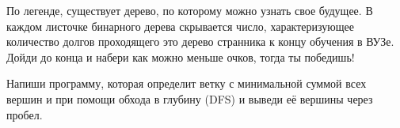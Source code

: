 По легенде, существует дерево, по которому можно узнать свое будущее. В каждом листочке бинарного дерева скрывается число, характеризующее количество долгов проходящего это дерево странника к концу обучения в ВУЗе. Дойди до конца и набери как можно меньше очков, тогда ты победишь! 

Напиши программу, которая определит ветку с минимальной суммой всех вершин и при помощи обхода в глубину (DFS) и выведи её вершины через пробел.
